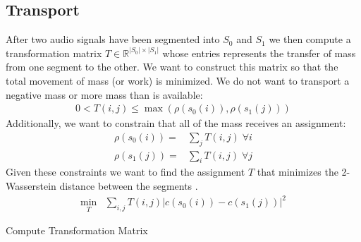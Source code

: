 \documentclass[12pt]{article}
\begin{document}
\subsection{Transport}

After two audio signals have been segmented into $S_0$ and $S_1$
we then compute a transformation matrix
$T\in \mathbb{R}^{|S_0|\times |S_1|}$
whose entries represents the transfer of mass from one segment to the other. 
We want to construct this matrix so that the total movement of mass (or work) is minimized.
We do not want to transport a negative mass or more mass than is available:
\begin{align}
  0 < T(i, j) \leq \max(\rho(s_0(i)), \rho(s_1(j)))
\end{align}
Additionally, we want to constrain that all of the mass receives an assignment:
\begin{align}
  \rho(s_0(i)) = &\sum_{j} T(i, j)
  \;
  \forall i
  \\
  \rho(s_1(j)) = &\sum_{i} T(i, j)
  \;
  \forall j
\end{align}
Given these constraints we want to find the assignment $T$ that minimizes the 2-Wasserstein distance between the segments
\cite{justin}.
\begin{align}
  \min_T &\sum_{i,j} T(i, j)|c(s_0(i)) - c(s_1(j))|^2
\end{align}

\begin{algorithm}
  \caption{Compute Transformation Matrix}\label{transport}
\begin{algorithmic}
    \Else
    \EndIf
  \EndWhile
\end{algorithmic}
\end{algorithm}
\end{document}
